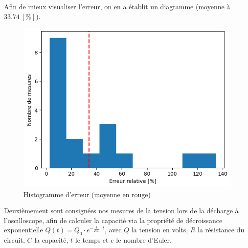 \documentclass[11pt]{article}
\begin{document}
Afin de mieux visualiser l'erreur, on en a établit un diagramme (moyenne à $33.74 \ [\%]$).
\begin{figure}[H]
\centering
\includegraphics[scale=0.5]{Images/histo-err.png}
\caption{Histogramme d'erreur (moyenne en rouge)}
\label{fig:histo-err}
\end{figure}

Deuxièmement sont consignées nos mesures de la tension lors de la décharge à l'oscilloscope, afin de calculer la capacité via la propriété de décroissance exponentielle $Q(t) = Q_0 \cdot e^{- \frac{1}{RC} \cdot t}$, avec $Q$ la tension en volts, $R$ la résistance du circuit, $C$ la capacité, $t$ le temps et $e$ le nombre d’Euler.

\begin{table}[H]
\hfill
{}\hfill
\caption{Mesure de la tension en fonction du temps}
\label{tab:mesqt_geo}
\end{table}
\end{document}
